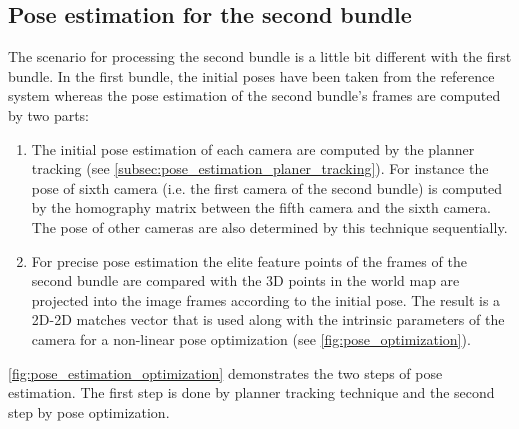 \subsection{Pose estimation for the second bundle} \label{subsec:pose_second_bundle}
The scenario for processing the second bundle is a little bit different with the first bundle. In the first bundle, the initial poses have been taken from the reference system whereas the pose estimation of the second bundle's frames are computed by two parts:
\begin{enumerate}
\item The initial pose estimation of each camera are computed by the planner tracking (see \autoref{subsec:pose_estimation_planer_tracking}). For instance the pose of sixth camera (i.e. the first camera of the second bundle) is computed by the homography matrix between the fifth camera and the sixth camera. The pose of other cameras are also determined by this technique sequentially. 
\item For precise pose estimation the elite feature points of the frames of the second bundle are compared with the 3D points in the world map are projected into the image frames according to the initial pose. The result is a 2D-2D matches vector that is used along with the intrinsic parameters of the camera for a non-linear pose optimization (see \autoref{fig:pose_optimization}). 
\end{enumerate}

\autoref{fig:pose_estimation_optimization} demonstrates the two steps of pose estimation. The first step is done by planner tracking technique and the second step by pose optimization.

